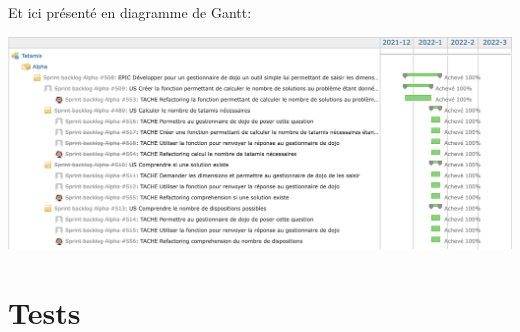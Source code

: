 \newpage
Et ici présenté en diagramme de Gantt:

\begin{center}
    \includegraphics[width=16cm]{images/tatamis-gantt-alpha.png}
\end{center}

\section{Tests}


